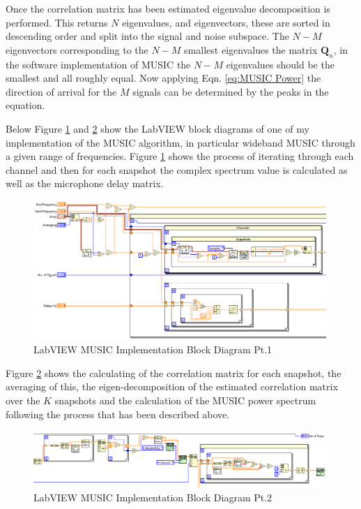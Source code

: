\documentclass{UoNMCHA}
\numberwithin{equation}{section}
\begin{document}
    Once the correlation matrix has been estimated eigenvalue decomposition is performed. This returns $N$ eigenvalues, and eigenvectors, these are sorted in descending order and split into the signal and noise subspace. The $N-M$ eigenvectors corresponding to the $N-M$ smallest eigenvalues the matrix $\mathbf{Q}_n$, in the software implementation of MUSIC the $N-M$ eigenvalues should be the smallest and all roughly equal. Now applying Eqn. \ref{eq:MUSIC Power} the direction of arrival for the $M$ signals can be determined by the peaks in the equation. 
    
    Below Figure \ref{fig:MUSICBlockPt1} and \ref{fig:MUSICBlockPt2} show the LabVIEW block diagrams of one of my implementation of the MUSIC algorithm, in particular wideband MUSIC through a given range of frequencies. Figure \ref{fig:MUSICBlockPt1} shows the process of iterating through each channel and then for each snapshot the complex spectrum value is calculated as well as the microphone delay matrix.
    
    \begin{figure}[H]
        \centering
        \includegraphics[keepaspectratio, width = 0.99\textwidth, frame]{Figures/MUSCBlockPt1.png}
        \caption{LabVIEW MUSIC Implementation Block Diagram Pt.1}
        \label{fig:MUSICBlockPt1}
    \end{figure}
    
    Figure \ref{fig:MUSICBlockPt2} shows the calculating of the correlation matrix for each snapshot, the averaging of this, the eigen-decomposition of the estimated correlation matrix over the $K$ snapshots and the calculation of the MUSIC power spectrum following the process that has been described above.

    \begin{figure}[H]
        \centering
        \includegraphics[keepaspectratio, width = 0.99\textwidth, frame]{Figures/MUSICBlockPt2.png}
        \caption{LabVIEW MUSIC Implementation Block Diagram Pt.2}
        \label{fig:MUSICBlockPt2}
    \end{figure}
    
\end{document}
